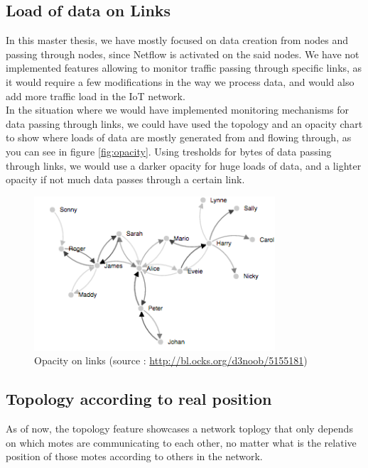 \subsection{Load of data on Links}

In this master thesis, we have mostly focused on data creation from nodes and passing through nodes, since Netflow is activated on the said nodes. We have not implemented features allowing to monitor traffic passing through specific links, as it would require a few modifications in the way we process data, and would also add more traffic load in the IoT network.\\

In the situation where we would have implemented monitoring mechanisms for data passing through links, we could have used the topology and an opacity chart to show where loads of data are mostly generated from and flowing through, as you can see in figure \ref{fig:opacity}. Using tresholds for bytes of data passing through links, we would use a darker opacity for huge loads of data, and a lighter opacity if not much data passes through a certain link.

\begin{figure}[!h]
	\centering
	\includegraphics[width=0.8\textwidth]{res/opacity.png}
	\caption{Opacity on links (source : \url{http://bl.ocks.org/d3noob/5155181})}
	\label{fig:nfsen}
\end{figure}

\subsection{Topology according to real position}

As of now, the topology feature showcases a network toplogy that only depends on which motes are communicating to each other, no matter what is the relative position of those motes according to others in the network. \\

